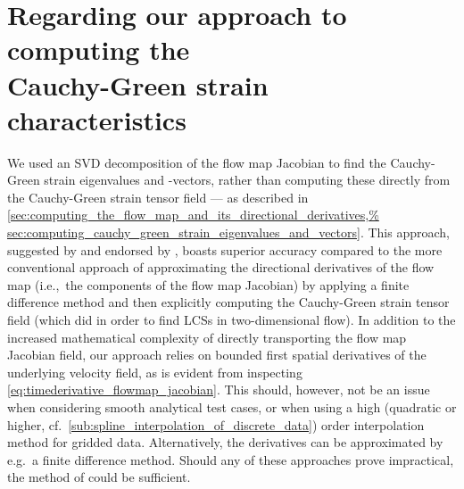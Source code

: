 \section[Regarding our approach to computing the Cauchy-Green
strain characteristics] {Regarding our approach to computing the%
    \\\phantom{5.1} Cauchy-Green strain characteristics}
\label{sec:regarding_our_approach_to_computing_the_cauchy_green%
_strain_characteristics}

We used an SVD decomposition of the flow map Jacobian to find the Cauchy-Green
strain eigenvalues and -vectors, rather than computing these directly from the
Cauchy-Green strain tensor field --- as described in
\cref{sec:computing_the_flow_map_and_its_directional_derivatives,%
sec:computing_cauchy_green_strain_eigenvalues_and_vectors}. This approach,
suggested by \textcite{miron2012anisotropic} and endorsed by
\textcite{oettinger2016autonomous}, boasts superior accuracy compared to the
more conventional approach of approximating the directional derivatives of the
flow map (i.e.,\ the components of the flow map Jacobian) by applying a finite
difference method and then explicitly computing the Cauchy-Green strain
tensor field (which \textcite{farazmand2012computing} did in order to find LCSs
in two-dimensional flow). In addition to the increased mathematical complexity
of directly transporting the flow map Jacobian field, our approach relies on
bounded first spatial derivatives of the underlying velocity field, as is
evident from inspecting \cref{eq:timederivative_flowmap_jacobian}. This should,
however, not be an issue when considering smooth analytical test cases, or when
using a high (quadratic or higher, cf.\
\cref{sub:spline_interpolation_of_discrete_data}) order interpolation method for
gridded data. Alternatively, the derivatives can be approximated by e.g.\ a
finite difference method. Should any of these approaches prove impractical, the
method of \textcite{farazmand2012computing} could be sufficient.

